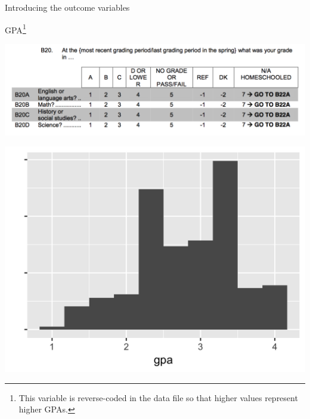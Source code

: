 \documentclass{beamer}
\begin{document}
\begin{frame}

\Large{
\begin{center}
Introducing the outcome variables
\end{center}
}

\end{frame}
\begin{frame}{GPA\footnote{This variable is reverse-coded in the data file so that higher values represent higher GPAs.}}

\centering
\includegraphics[width = .9\textwidth]{figures/GPA_questionnaire}

\end{frame}
\begin{frame}

\centering
\includegraphics[width = .9\textwidth]{figures/gpaDist}

\end{frame}
\end{document}
